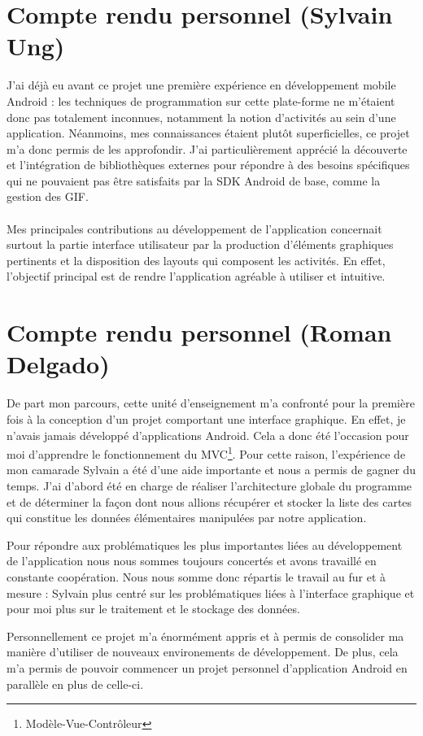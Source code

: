 \section{Compte rendu personnel (Sylvain Ung)}

J'ai déjà eu avant ce projet une première expérience en développement mobile Android : les techniques de programmation sur cette plate-forme ne m'étaient donc pas totalement inconnues, notamment la notion d'activités au sein d'une application. Néanmoins, mes connaissances étaient plutôt superficielles, ce projet m'a donc permis de les approfondir. J'ai particulièrement apprécié la découverte et l'intégration de bibliothèques externes pour répondre à des besoins spécifiques qui ne pouvaient pas être satisfaits par la SDK Android de base, comme la gestion des GIF.
\paragraph{}
Mes principales contributions au développement de l'application concernait surtout la partie interface utilisateur par la production d'éléments graphiques pertinents et la disposition des layouts qui composent les activités. En effet, l'objectif principal est de rendre l'application agréable à utiliser et intuitive.

\newpage
\section{Compte rendu personnel (Roman Delgado)}

De part mon parcours, cette unité d'enseignement m'a confronté pour la première fois à la conception d'un projet comportant une interface graphique. En effet, je n'avais jamais développé d'applications Android. Cela a donc été l'occasion pour moi d'apprendre le fonctionnement du MVC\footnote{Modèle-Vue-Contrôleur}. Pour cette raison, l'expérience de mon camarade Sylvain a été d'une aide importante et nous a permis de gagner du temps.
J'ai d'abord été en charge de réaliser l'architecture globale du programme et de déterminer la façon dont nous allions récupérer et stocker la liste des cartes qui constitue les données élémentaires manipulées par notre application.

Pour répondre aux problématiques les plus importantes liées au développement de l'application nous nous sommes toujours concertés et avons travaillé en constante coopération.
Nous nous somme donc répartis le travail au fur et à mesure : Sylvain plus centré sur les problématiques liées à l'interface graphique et pour moi plus sur le traitement et le stockage des données.

Personnellement ce projet m'a énormément appris et à permis de consolider ma manière d'utiliser de nouveaux environements de développement. De plus, cela m'a permis de pouvoir commencer un projet personnel d'application Android en parallèle en plus de celle-ci.